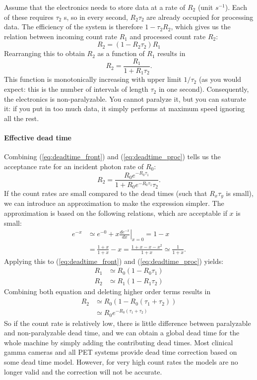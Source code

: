 \documentclass[11pt,oneside]{article}
\begin{document}
Assume that the electronics needs to store data at a rate of $R_2$ (unit
$s^{-1}$). Each of these requires $\tau_2$ s, so in every second, $R_2 \tau_2$
are already occupied for processing data. The efficiency of the system is
therefore $1 - \tau_2 R_2$, which gives us the relation between incoming count
rate $R_1$ and processed count rate $R_2$:
\begin{equation}
  R_2 = (1 - R_2 \tau_2) R_1
\end{equation}
Rearranging this to obtain $R_2$ as a function of $R_1$ results in
\begin{equation}
  R_2 = \frac{R_1}{1 + R_1 \tau_2}. \label{eq:deadtime_proc}
\end{equation}
This function is monotonically increasing with upper limit $1 /
\tau_2$ (as you would expect: this is the number of intervals of
length $\tau_2$ in one second).  Consequently, the electronics is
non-paralyzable. You cannot paralyze it, but you can saturate it: if
you put in too much data, it simply performs at maximum speed ignoring
all the rest.

\paragraph{Effective dead time}
Combining (\ref{eq:deadtime_front}) and (\ref{eq:deadtime_proc}) tells us the
acceptance rate for an incident photon rate of $R_0$:
\begin{equation}
  R_2 = \frac{R_0 e^{-R_0 \tau_1}}{ 1 + R_0 e^{-R_0 \tau_1} \tau_2}.
\end{equation}
If the count rates are small compared to the dead times (such that $R_x
\tau_y$ is small), we can introduce an approximation to make the
expression simpler. The approximation is based on the following relations,
which are acceptable if $x$ is small:
\begin{align}
  e^{-x} &\simeq e^{-0} + x \left. \frac{d e^{-x}}{dx} \right|_{x=0}= 1-x\\
         &= \frac{1+x}{1+x} - x = \frac{1+x-x-x^2}{1+x} 
        \simeq \frac{1}{1 + x}.
\end{align}
Applying this to (\ref{eq:deadtime_front}) and (\ref{eq:deadtime_proc}) yields:
\begin{align}
  R_1 &\simeq R_0 (1 - R_0 \tau_1)\\
  R_2 &\simeq R_1 (1 - R_1 \tau_2)
\end{align}
Combining both equation and deleting higher order terms results in
\begin{align}
  R_2 &\simeq R_0 \left(1 - R_0 (\tau_1 + \tau_2) \right) \label{eq:dead1}\\
      &\simeq R_0 e^{- R_0 (\tau_1 + \tau_2)} \label{eq:dead2}
\end{align}
So if the count rate is relatively low, there is little difference between
paralyzable and non-paralyzable dead time, and we can obtain a global dead
time for the whole machine by simply adding the contributing dead times.  Most
clinical gamma cameras and all PET systems provide dead time correction based
on some dead time model. However, for very high count rates the models are no
longer valid and the correction will not be accurate.
\end{document}
